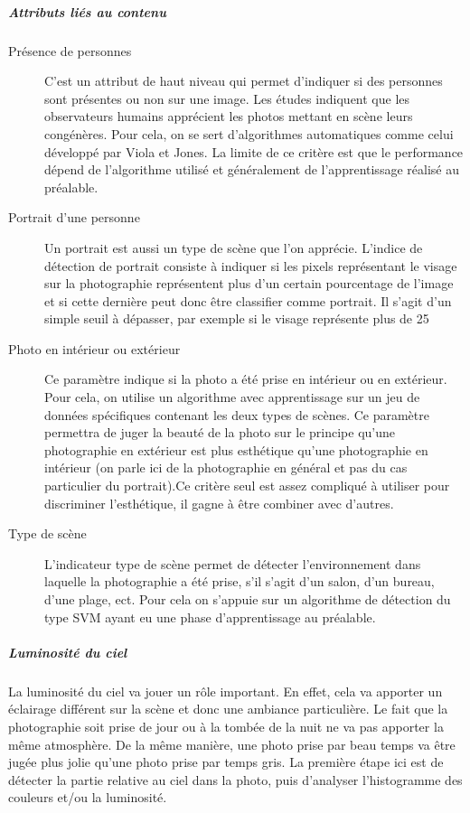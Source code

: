 \documentclass[11pt, french]{report-rd-info}
\begin{document}
\subparagraph{Attributs liés au contenu}
\begin{description}
\item[Présence de personnes]
C’est un attribut de haut niveau qui permet d’indiquer si des personnes sont présentes ou non sur une image. Les études indiquent que les observateurs humains apprécient les photos mettant en scène leurs congénères. Pour cela, on se sert d’algorithmes automatiques comme celui développé par Viola et Jones. La limite de ce critère est que le performance dépend de l’algorithme utilisé et généralement de l’apprentissage réalisé au préalable. 

\item[Portrait d'une personne]
Un portrait est aussi un type de scène que l’on apprécie. L’indice de détection de portrait consiste à indiquer si les pixels représentant le visage sur la photographie représentent plus d’un certain pourcentage de l’image et si cette dernière peut donc être classifier comme portrait. Il s’agit d’un simple seuil à dépasser, par exemple si le visage représente plus de 25%

\item[Photo en intérieur ou extérieur]
Ce paramètre indique si la photo a été prise en intérieur ou en extérieur. Pour cela, on utilise un algorithme avec apprentissage sur un jeu de données spécifiques contenant les deux types de scènes. Ce paramètre permettra de juger la beauté de la photo sur le principe qu’une photographie en extérieur est plus esthétique qu’une photographie en intérieur (on parle ici de la photographie en général et pas du cas particulier du portrait).Ce critère seul est assez compliqué à utiliser pour discriminer l’esthétique, il gagne à être combiner avec d’autres.

\item[Type de scène]
L’indicateur type de scène permet de détecter l’environnement dans laquelle la photographie a été prise, s’il s’agit d’un salon, d’un bureau, d’une plage, ect. Pour cela on s’appuie sur un algorithme de détection du type SVM ayant eu une phase d’apprentissage au préalable.

\end{description}

\subparagraph{Luminosité du ciel}
La luminosité du ciel va jouer un rôle important. En effet, cela va apporter un éclairage différent sur la scène et donc une ambiance particulière. Le fait que la photographie soit prise de jour ou à la tombée de la nuit ne va pas apporter la même atmosphère. De la même manière, une photo prise par beau temps va être jugée plus jolie qu’une photo prise par temps gris. La première étape ici est de détecter la partie relative au ciel dans la photo, puis d’analyser l’histogramme des couleurs et/ou la luminosité.
\end{document}
